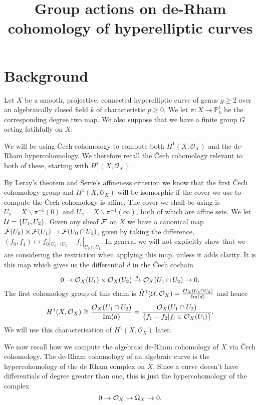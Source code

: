\documentclass[draft, 11pt]{article} %
\title{Group actions on de-Rham cohomology of hyperelliptic curves}
\author{}
\theoremstyle{plain}
\theoremstyle{remark}
\newcommand{\cO}{{\cal O}}
\newcommand{\cech}{\v{C}ech }
\newcommand{\hone}{H^1(X,\mathcal{O}_X)}
\newcommand{\cechhone}{\check{H}^1(\mathcal U,\mathcal O_X)}
\DeclareMathOperator{\Ima}{Im}
\begin{document}
\maketitle

\section{Background}

Let $X$ be a smooth, projective, connected hyperelliptic curve of genus $g \geq 2$ over an algebraically closed field $k$ of characteristic $p \geq 0$.
We let $\pi \colon X \rightarrow \mathbb P_k^1$ be the corresponding degree two map.
We also suppose that we have a finite group $G$ acting fatihfully on $X$.

We will be using \cech cohomology to compute both $\hone$ and the de-Rham hypercohomology.
We therefore recall the \cech cohomology relevant to both of these, starting with $\hone$.

By Leray's theorem \cite[Thm 5.2.12]{liu} and Serre's affineness criterion \cite[Thm 5.2.23]{liu} we know that the first \cech cohomology group and $\hone$ will be isomorphic if the cover we use to compute the \cech cohomology is affine.
The cover we shall be using is $U_1 = X\backslash \pi^{-1}(0)$ and $U_2 = X\backslash  \pi^{-1}(\infty) $, both of which are affine sets.
We let ${\cal U} = \{ U_1, U_2\}$.
Given any sheaf $\cal F$ on $X$ we have a canonical map ${\cal F}(U_0) \times {\cal F} (U_1) \rightarrow {\cal F}(U_0 \cap U_1)$, given by taking the difference, $(f_0,f_1) \mapsto f_0|_{U_0 \cap U_1} - f_1|_{U_0 \cap U_1}$.
In general we will not explicitly show that we are considering the restriction when applying this map, unless it adds clarity.
It is this map which gives us the differential $d$ in the \cech cochain
\begin{equation*}
0 \rightarrow \cO_X(U_1)\times \cO_X(U_2) \xrightarrow{d} \cO_X(U_1 \cap U_2) \rightarrow 0.
\end{equation*}
The first cohomology group of this chain is $\cechhone = \frac{\cO_X(U_1 \cap U_2)}{\Ima(d)}$ and hence
\begin{equation}
\hone \cong \frac{\cO_X(U_1 \cap U_2)}{\Ima(d)}  
 = \frac{\cO_X(U_1 \cap U_2)}{\{f_1 - f_2 | f_i \in \cO_X(U_i) \}}.
\end{equation}
We will use this characterisation of $\hone$ later.

We now recall how we compute the algebraic de-Rham cohomology of $X$ via \cech cohomology.
The de-Rham cohomology of an algebraic curve is the hypercohomology of the de Rham complex on $X$. 
Since a curve doesn't have differentials of degree greater than one, this is just the hypercohomology of the complex
\begin{equation}\label{res}
0 \rightarrow \cO_X \rightarrow \Omega_X \rightarrow 0.
\end{equation}
\end{document}
